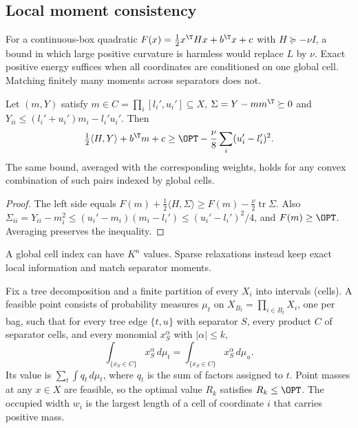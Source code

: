 \subsection{Local moment consistency}\label{sec:limits-moments}

For a continuous-box quadratic $F(x)=\frac12x^{\T}Hx+b^{\T}x+c$
with $H\succeq-\nu I$, a bound in which large positive curvature is harmless
would replace $L$ by $\nu$. Exact positive energy suffices when all
coordinates are conditioned on one global cell. Matching finitely many
moments across separators does not.

\begin{lemma}\label{lim:lem:mixture}
Let $(m,Y)$ satisfy $m\in C=\prod_i[l_i',u_i']\subseteq X$,
$\Sigma=Y-mm^{\T}\succeq0$ and $Y_{ii}\le(l_i'+u_i')m_i-l_i'u_i'$.
Then
\[
\tfrac12\langle H,Y\rangle+b^{\T}m+c\ge\OPT-\frac\nu8
\sum_i(u_i'-l_i')^2 .
\]
The same bound, averaged with the corresponding weights, holds for any
convex combination of such pairs indexed by global cells.
\end{lemma}

\begin{proof}
The left side equals
$F(m)+\frac12\langle H,\Sigma\rangle\ge F(m)-\frac\nu2\operatorname{tr}\Sigma$.
Also $\Sigma_{ii}=Y_{ii}-m_i^2\le(u_i'-m_i)(m_i-l_i')\le(u_i'-l_i')^2/4$, and
$F(m)\ge\OPT$. Averaging preserves the inequality.
\end{proof}

A global cell index can have $K^n$ values. Sparse relaxations instead keep
exact local information and match separator moments.

\begin{definition}
\label{lim:def:moments}
Fix a tree decomposition and a finite partition of every $X_i$ into
intervals (cells). A feasible point consists of probability measures
$\mu_t$ on $X_{B_t}=\prod_{i\in B_t}X_i$, one per bag, such that for every
tree edge $\{t,u\}$ with separator $S$, every product $C$ of separator cells,
and every monomial $x_S^\alpha$ with $|\alpha|\le k$,
\[
\int_{\{x_S\in C\}}x_S^\alpha\,d\mu_t=\int_{\{x_S\in C\}}x_S^\alpha\,d\mu_u .
\]
Its value is $\sum_t\int q_t\,d\mu_t$, where $q_t$ is the sum of factors
assigned to $t$. Point masses at any $x\in X$ are feasible, so the optimal
value $R_k$ satisfies $R_k\le\OPT$. The occupied width $w_i$ is the largest
length of a cell of coordinate $i$ that carries positive mass.
\end{definition}

